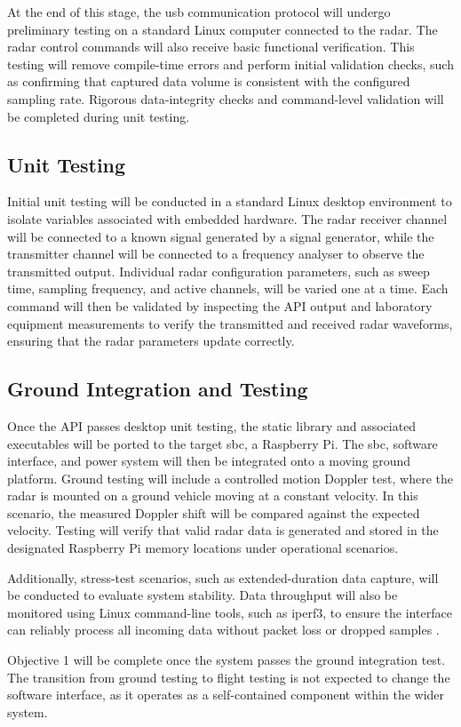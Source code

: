 At the end of this stage, the \gls{usb} communication protocol will undergo preliminary testing on a standard Linux computer connected to the radar. The radar control commands will also receive basic functional verification. This testing will remove compile-time errors and perform initial validation checks, such as confirming that captured data volume is consistent with the configured sampling rate. Rigorous data-integrity checks and command-level validation will be completed during unit testing.

\subsection{Unit Testing}
\label{chap:413}

Initial unit testing will be conducted in a standard Linux desktop environment to isolate variables associated with embedded hardware. The radar receiver channel will be connected to a known signal generated by a signal generator, while the transmitter channel will be connected to a frequency analyser to observe the transmitted output. Individual radar configuration parameters, such as sweep time, sampling frequency, and active channels, will be varied one at a time. Each command will then be validated by inspecting the API output and laboratory equipment measurements to verify the transmitted and received radar waveforms, ensuring that the radar parameters update correctly.

\subsection{Ground Integration and Testing}
\label{chap:414}

Once the API passes desktop unit testing, the static library and associated executables will be ported to the target \gls{sbc}, a Raspberry Pi. The \gls{sbc}, software interface, and power system will then be integrated onto a moving ground platform. Ground testing will include a controlled motion Doppler test, where the radar is mounted on a ground vehicle moving at a constant velocity. In this scenario, the measured Doppler shift will be compared against the expected velocity. Testing will verify that valid radar data is generated and stored in the designated Raspberry Pi memory locations under operational scenarios.

Additionally, stress-test scenarios, such as extended-duration data capture, will be conducted to evaluate system stability. Data throughput will also be monitored using Linux command-line tools, such as iperf3, to ensure the interface can reliably process all incoming data without packet loss or dropped samples \cite{iperf_fr}.

Objective 1 will be complete once the system passes the ground integration test. The transition from ground testing to flight testing is not expected to change the software interface, as it operates as a self-contained component within the wider system.